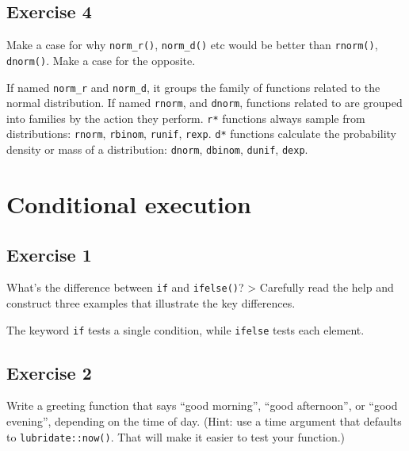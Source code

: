 \documentclass[]{book}
\theoremstyle{plain}
\theoremstyle{remark}
\theoremstyle{definition}
\theoremstyle{definition}
\theoremstyle{definition}
\theoremstyle{remark}
\begin{document}
\hypertarget{exercise-4-27}{%
\subsection{Exercise 4}\label{exercise-4-27}}

Make a case for why \texttt{norm\_r()}, \texttt{norm\_d()} etc would be
better than \texttt{rnorm()}, \texttt{dnorm()}. Make a case for the
opposite.

If named \texttt{norm\_r} and \texttt{norm\_d}, it groups the family of
functions related to the normal distribution. If named \texttt{rnorm},
and \texttt{dnorm}, functions related to are grouped into families by
the action they perform. \texttt{r*} functions always sample from
distributions: \texttt{rnorm}, \texttt{rbinom}, \texttt{runif},
\texttt{rexp}. \texttt{d*} functions calculate the probability density
or mass of a distribution: \texttt{dnorm}, \texttt{dbinom},
\texttt{dunif}, \texttt{dexp}.

\hypertarget{conditional-execution}{%
\section{Conditional execution}\label{conditional-execution}}

\hypertarget{exercise-1-51}{%
\subsection{Exercise 1}\label{exercise-1-51}}

What's the difference between \texttt{if} and \texttt{ifelse()}?
\textgreater{} Carefully read the help and construct three examples that
illustrate the key differences.

The keyword \texttt{if} tests a single condition, while \texttt{ifelse}
tests each element.

\hypertarget{exercise-2-49}{%
\subsection{Exercise 2}\label{exercise-2-49}}

Write a greeting function that says ``good morning'', ``good
afternoon'', or ``good evening'', depending on the time of day. (Hint:
use a time argument that defaults to \texttt{lubridate::now()}. That
will make it easier to test your function.)
\end{document}

